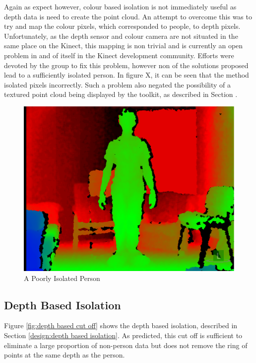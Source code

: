 Again as expect however, colour based isolation is not immediately useful as depth data is need to create the point cloud. An attempt to overcome this was to try and map the colour pixels, which corresponded to people, to depth pixels.
Unfortunately, as the depth sensor and colour camera are not situated in the same place on the Kinect, this mapping is non trivial and is currently an open problem in and of itself in the Kinect development community.
Efforts were devoted by the group to fix this problem, however non of the solutions proposed lead to a sufficiently isolated person.
In figure X, it can be seen that the method isolated pixels incorrectly. 
Such a problem also negated the possibility of a textured point cloud being displayed by the toolkit, as described in Section .

\begin{figure}[h]
\begin{center}
\includegraphics[scale=0.4]{./design/parse1} 
\end{center}
\caption{A Poorly Isolated Person}
\label{fig:a poorly isolated person}
\end{figure} 

\subsection{Depth Based Isolation}
\label{testing:depth based isolation}
Figure \ref{fig:depth based cut off} shows the depth based isolation, described in Section \ref{design:depth based isolation}. As predicted, this cut off is sufficient to eliminate a large proportion of non-person data but does not remove the ring of points at the same depth as the person.\\

